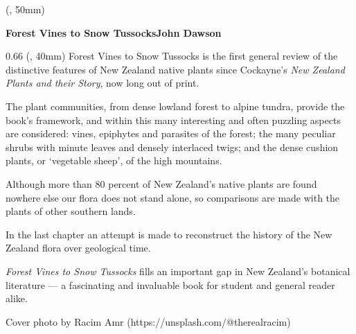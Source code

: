 	\begin{textblock*}{1pt} (\spineoffset-7pt, 50mm)
		\centering%
		\begin{rotate}{-90}
			\fontsize{18}{18}\selectfont%
			\textbf{Forest Vines to Snow Tussocks\hspace{11em}John Dawson}
		\end{rotate}
	\end{textblock*}

	\begin{textblock*}{0.66\coverwidth} (\backcoveroffset, 40mm)
		\Large\centering%
		\setlength{\parskip}{1em}%
		Forest Vines to Snow Tussocks is the first general review of the distinctive features of New Zealand native plants since Cockayne's \emph{New Zealand Plants and their Story}, now long out of print.

		The plant communities, from dense lowland forest to alpine tundra, provide the book's framework, and within this many interesting and often puzzling aspects are considered: vines, epiphytes and parasites of the forest; the many peculiar shrubs with minute leaves and densely interlaced twigs; and the dense cushion plants, or `vegetable sheep', of the high mountains.

		Although more than 80 percent of New Zealand's native plants are found nowhere else our flora does not stand alone, so comparisons are made with the plants of other southern lands.

		In the last chapter an attempt is made to reconstruct the history of the New Zealand flora over geological time.

		\emph{Forest Vines to Snow Tussocks} fills an important gap in New Zealand's botanical literature — a fascinating and invaluable book for student and general reader alike.
		
		\vspace{5em}%
		{\small Cover photo by Racim Amr (https://unsplash.com/@therealracim)}
	\end{textblock*}



